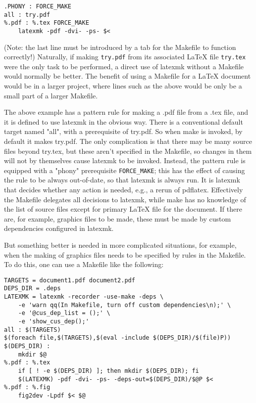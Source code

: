 \begin{verbatim}
.PHONY : FORCE_MAKE
all : try.pdf
%.pdf : %.tex FORCE_MAKE
	latexmk -pdf -dvi- -ps- $<
\end{verbatim}

(Note: the last line must be introduced by a tab for  the  Makefile  to
function  correctly!)  Naturally, if making \verb|try.pdf| from its associated LaTeX
file \verb|try.tex| were the only task to be performed, a direct use  of latexmk
without  a  Makefile would normally be better.  The benefit of using a Makefile
for a LaTeX document would be  in  a  larger  project, where lines such as the
above would be only be a small part of a larger Makefile.

The above example has a pattern rule for making a .pdf file from a .tex file,
and it is defined to use latexmk in the obvious way.  There is a conventional
default  target  named  "all",  with  a  prerequisite  of try.pdf.   So  when
make is invoked, by default it makes try.pdf.  The only complication is  that
there  may  be  many  source  files  beyond try.tex, but these aren't specified
in the Makefile, so changes in them will not by themselves cause latexmk to be
invoked.  Instead, the  pattern  rule is equipped with a "phony" prerequisite
\verb|FORCE_MAKE|; this has the effect of causing the rule to be always
out-of-date,  so  that  latexmk  is always run.  It is latexmk that decides
whether any action is needed, e.g., a rerun of pdflatex.  Effectively the
Makefile  delegates all  decisions  to  latexmk, while make has no knowledge of
the list of source files except for primary LaTeX file for the  document.  If
there are, for example, graphics files to be made, these must be made by custom
dependencies configured in latexmk.

But something better is needed in more complicated situations, for  example,
when the making of graphics files needs to be specified by rules in the
Makefile.  To do this, one can use a Makefile like  the  following:

\begin{verbatim}
TARGETS = document1.pdf document2.pdf
DEPS_DIR = .deps
LATEXMK = latexmk -recorder -use-make -deps \
	-e 'warn qq(In Makefile, turn off custom dependencies\n);' \
	-e '@cus_dep_list = ();' \
	-e 'show_cus_dep();'
all : $(TARGETS)
$(foreach file,$(TARGETS),$(eval -include $(DEPS_DIR)/$(file)P))
$(DEPS_DIR) :
	mkdir $@
%.pdf : %.tex
	if [ ! -e $(DEPS_DIR) ]; then mkdir $(DEPS_DIR); fi
	$(LATEXMK) -pdf -dvi- -ps- -deps-out=$(DEPS_DIR)/$@P $<
%.pdf : %.fig
	fig2dev -Lpdf $< $@
\end{verbatim}

